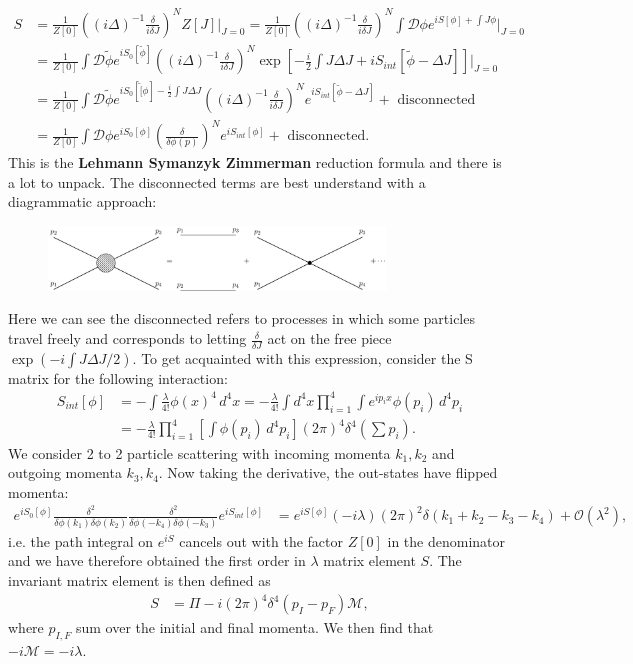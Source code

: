\documentclass[a4paper, 11pt, normalem]{report}
\begin{document}
\begin{align}
    S &= \frac{1}{Z[0]}\left((i\Delta)^{-1}\frac{\delta}{i\delta J}\right)^NZ[J]\bigg|_{J=0} = \frac{1}{Z[0]}\left((i\Delta)^{-1}\frac{\delta}{i\delta J}\right)^N \int \mathcal{D}\phi e^{iS[\phi]+\int J\phi}\bigg|_{J=0} \\
      &= \frac{1}{Z[0]}\int \mathcal{D}\tilde{\phi}e^{iS_0[\tilde{\phi}]}\left((i\Delta)^{-1}\frac{\delta}{i\delta J}\right)^N \exp\left[-\frac{i}{2}\int J\Delta J + iS_{int}[\tilde{\phi}-\Delta J]\right]\bigg|_{J=0} \\
      &= \frac{1}{Z[0]}\int \mathcal{D}\tilde{\phi}e^{iS_0[\tilde[\phi]-\frac{i}{2}\int J\Delta J} \left((i\Delta)^{-1}\frac{\delta}{i\delta J}\right)^N e^{iS_{int}[\tilde{\phi}-\Delta J]}+\text{ disconnected} \\
      &= \frac{1}{Z[0]}\int \mathcal{D}\phi e^{iS_0[\phi]}\left(\frac{\delta}{\delta\phi(p)}\right)^Ne^{iS_{int}[\phi]}+\text{ disconnected}.
\end{align}
This is the \textbf{Lehmann Symanzyk Zimmerman} reduction formula and there is a lot to unpack.
The disconnected terms are best understand with a diagrammatic approach:
\begin{figure}[H]
    \centering
    \includegraphics[width=0.8\textwidth]{fours.pdf}
\end{figure}
Here we can see the disconnected refers to processes in which some particles travel freely and corresponds to letting $\frac{\delta}{\delta J}$ act on the free piece $\exp\left(-i\int J\Delta J/2\right)$.
To get acquainted with this expression, consider the S matrix for the following interaction:
\begin{align}
    S_{int}[\phi] &= -\int \frac{\lambda}{4!}\phi(x)^4\,d^4x = -\frac{\lambda}{4!}\int d^4x \prod_{i=1}^4 \int e^{ip_ix}\phi(p_i)\,d^4p_i \\
                  &= -\frac{\lambda}{4!}\prod_{i=1}^4 \left[\int \phi(p_i)\,d^4p_i\right](2\pi)^4\delta^4\left(\sum p_i\right).
\end{align}
We consider 2 to 2 particle scattering with incoming momenta $k_1,k_2$ and outgoing momenta $k_3,k_4$.
Now taking the derivative, the out-states have flipped momenta:
\begin{align}
    e^{iS_0[\phi]}\frac{\delta^2}{\delta\phi(k_1)\delta\phi(k_2)}\frac{\delta^2}{\delta\phi(-k_4)\delta\phi(-k_3)}e^{iS_{int}[\phi]} &= e^{iS[\phi]}(-i\lambda)(2\pi)^2\delta(k_1+k_2-k_3-k_4)+\mathcal{O}(\lambda^2),
\end{align}
i.e. the path integral on $e^{iS}$ cancels out with the factor $Z[0]$ in the denominator and we have therefore obtained the first order in $\lambda$ matrix element $S$.
The invariant matrix element is then defined as
\begin{align}
    S &= \Pi - i(2\pi)^4\delta^4(p_I-p_F)\mathcal{M},
\end{align}
where $p_{I,F}$ sum over the initial and final momenta.
We then find that $-i\mathcal{M}=-i\lambda$.
\end{document}
